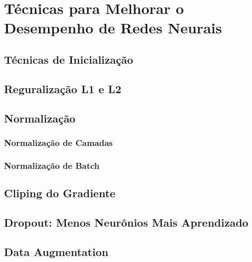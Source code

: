 
\chapter{Técnicas para Melhorar o Desempenho de Redes Neurais}
\label{cap:regularizacao}


\section{Técnicas de Inicialização}

\section{Reguralização L1 e L2}

\section{Normalização}

\subsection{Normalização de Camadas}

\subsection{Normalização de Batch}

\section{Cliping do Gradiente}

\section{Dropout: Menos Neurônios Mais Aprendizado}

\section{Data Augmentation}

